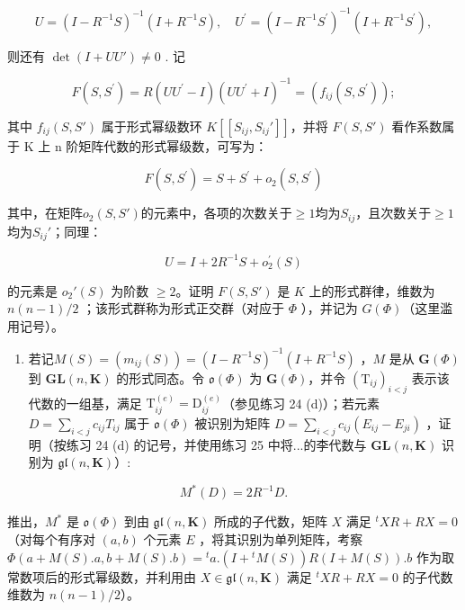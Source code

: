 \[
U = (I - R ^ {- 1} S) ^ {- 1} (I + R ^ {- 1} S), \quad U ^ {\prime} = (I - R ^ {- 1} S ^ {\prime}) ^ {- 1} (I + R ^ {- 1} S ^ {\prime}),
\]

则还有 \(\operatorname{det}(I + UU') \neq 0\) . 记

\[
F (S, S ^ {\prime}) = R \left(U U ^ {\prime} - I\right) \left(U U ^ {\prime} + I\right) ^ {- 1} = \left(f _ {i j} \left(S, S ^ {\prime}\right)\right);
\]

其中 \(f_{ij}(S, S')\) 属于形式幂级数环 \(K[[S_{ij}, S_{ij}']]\)，并将 \(F(S, S')\) 看作系数属于 K 上 n 阶矩阵代数的形式幂级数，可写为：

\[
F (S, S ^ {\prime}) = S + S ^ {\prime} + o _ {2} (S, S ^ {\prime})
\]

其中，在矩阵\(o_2(S, S')\)的元素中，各项的次数关于\(\geqslant 1\)均为\(S_{ij}\)，且次数关于\(\geqslant 1\)均为\(S_{ij}'\)；同理：

\[
U = I + 2 R ^ {- 1} S + o _ {2} ^ {\prime} (S)
\]

 的元素是 \(o_2'(S)\) 为阶数 \(\geqslant 2\)。证明 \(F(S, S')\) 是 \(K\) 上的形式群律，维数为 \(n(n - 1)/2\) ；该形式群称为形式正交群（对应于 \(\Phi\) ），并记为 \(G(\Phi)\)（这里滥用记号）。

\begin{enumerate}
\def\labelenumi{(\alph{enumi})}
\setcounter{enumi}{1}
\tightlist
\item
  若记\(M(S) = (m_{ij}(S)) = (I - R^{-1}S)^{-1}(I + R^{-1}S)\) ，\(M\) 是从 \(\mathbf{G}(\Phi)\) 到 \(\mathbf{GL}(n, \mathbf{K})\)  的形式同态。令 \(\mathfrak{o}(\Phi)\) 为 \(\mathbf{G}(\Phi)\)，并令 \((\mathrm{T}_{ij})_{i < j}\) 表示该代数的一组基，满足 \(\mathrm{T}_{ij}^{(e)} = \mathrm{D}_{ij}^{(e)}\)（参见练习 24 (d)）；若元素 \(D = \sum_{i < j} c_{ij} T_{ij}\) 属于 \(\mathfrak{o}(\Phi)\) 被识别为矩阵 \(D = \sum_{i < j} c_{ij}(E_{ij} - E_{ji})\) ，证明（按练习 24 (d) 的记号，并使用练习 25 中将...的李代数与 \(\mathbf{GL}(n, \mathbf{K})\) 识别为 \(\mathfrak{gl}(n, \mathbf{K})\)）:
\end{enumerate}

\[
M ^ {*} (D) = 2 R ^ {- 1} D.
\]

  推出，\(M^*\) 是 \(\mathfrak{o}(\Phi)\) 到由 \(\mathfrak{gl}(n, \mathbf{K})\) 所成的子代数，矩阵 \(X\) 满足 \({}^{t}XR + RX = 0\)（对每个有序对 \((a, b)\) 个元素 \(E\) ，将其识别为单列矩阵，考察 \(\Phi(a + M(S).a, b + M(S).b) = {}^{t}a.(I + {}^{t}M(S))R(I + M(S)).b\) 作为取常数项后的形式幂级数，并利用由 \(X \in \mathfrak{gl}(n, \mathbf{K})\) 满足 \({}^{t}XR + RX = 0\) 的子代数维数为 \(n(n - 1)/2\)）。

